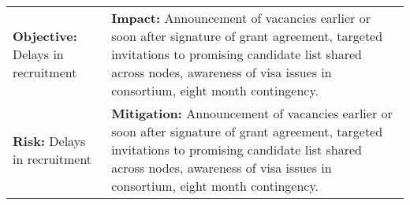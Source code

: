 \begin{center}%
\begin{tabular}{p{60mm}p{103mm}}
\toprule
\midrule
\textbf{Objective:} Delays in recruitment & \textbf{Impact:} Announcement of vacancies earlier or soon after signature of grant agreement, targeted invitations to promising candidate list shared across nodes, awareness of visa issues in consortium, eight month contingency. \\
\textbf{Risk:} Delays in recruitment & \textbf{Mitigation:} Announcement of vacancies earlier or soon after signature of grant agreement, targeted invitations to promising candidate list shared across nodes, awareness of visa issues in consortium, eight month contingency. \\
\bottomrule
\end{tabular}
\end{center}

\clearpage
\begingroup

    \linespread{0.9}\selectfont

\endgroup
  
